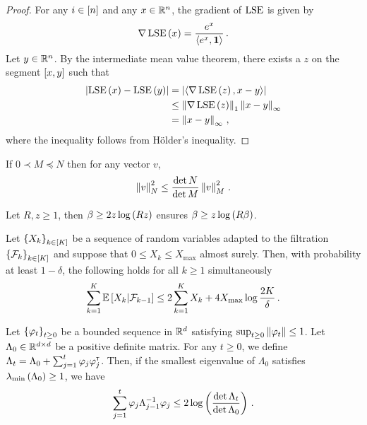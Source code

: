\begin{proof}
  For any $i \in \left[ n \right]$ and any $x \in \mathbb{R}^n$, the gradient of $\operatorname{LSE}$ is given by
  \begin{equation*}
    \nabla \operatorname{LSE} \left( x \right) = \frac{e^{x}}{\left\langle e^{x}, \mathbf{1} \right\rangle}\,.
  \end{equation*}
  Let $y \in \mathbb{R}^n$. By the intermediate mean value theorem, there exists a $z$ on the segment $\left[ x, y \right]$ such that
  \begin{align*}
    \left|\operatorname{LSE} \left( x \right) - \operatorname{LSE} \left( y \right)\right| &= \left|\left\langle \nabla \operatorname{LSE} \left( z \right), x - y \right\rangle\right| \\
    &\leq \left\|\nabla \operatorname{LSE} \left( z \right)\right\|_1 \left\|x - y\right\|_\infty \\
    &= \left\|x - y\right\|_\infty\,,
  \end{align*}
  where the inequality follows from Hölder's inequality.
\end{proof}


\begin{lemma} \label{lem:det-elliptical-bound}
  If $0 \prec M \preceq N$ then for any vector $v$,
  \begin{equation*}
    \left\|v\right\|_N^2 \leq \frac{\det N}{\det M} \left\|v\right\|_M^2\,.
  \end{equation*}
\end{lemma}


\begin{lemma} \label{lemma:beta_bound}
    Let $R, z \geq 1$, then $\beta \geq 2 z \log \left( R z \right)$ ensures $\beta \geq z \log \left( R \beta \right)$.
\end{lemma}

\begin{lemma} \label{lem:concentration-ineq-cond-exp}
  Let $\left\{{X_k}\right\}_{k \in [K]}$ be a sequence of random variables adapted to the filtration $\left\{{\mathcal{F}_k}\right\}_{k\in[K]}$ and suppose that $0 \leq X_k \leq X_{\max}$ almost surely. Then, with probability at least $1-\delta$, the following holds for all $k \geq 1$ simultaneously
  \begin{equation*}
    \sum^K_{k=1} \mathbb{E}\left[{X_k | \mathcal{F}_{k-1}}\right] \leq 2 \sum^K_{k=1} X_k + 4 X_{\max} \log \frac{2 K}{\delta}\,.
  \end{equation*}
\end{lemma}

\begin{lemma} \label{lem:bound-elliptical-potential}
  Let $\left\{ \varphi_t \right\}_{t \geq 0}$ be a bounded sequence in $\mathbb{R}^d$ satisfying $\sup_{t \geq 0} \left\|\varphi_t\right\| \leq 1$. Let $\Lambda_0 \in \mathbb{R}^{d \times d}$ be a positive definite matrix. For any $t \geq 0$, we define $\Lambda_t = \Lambda_0 + \sum_{j=1}^t \varphi_j \varphi_j^\mathsf{\scriptscriptstyle T}$. Then, if the smallest eigenvalue of $\Lambda_0$ satisfies $\lambda_{\mathrm{min}} \left( \Lambda_0 \right) \geq 1$, we have
  \begin{equation*}
    \sum_{j=1}^t \varphi_j \Lambda_{j-1}^{-1} \varphi_j \leq 2 \log \left( \frac{\det \Lambda_t}{\det \Lambda_0} \right)\,.
  \end{equation*}
\end{lemma}